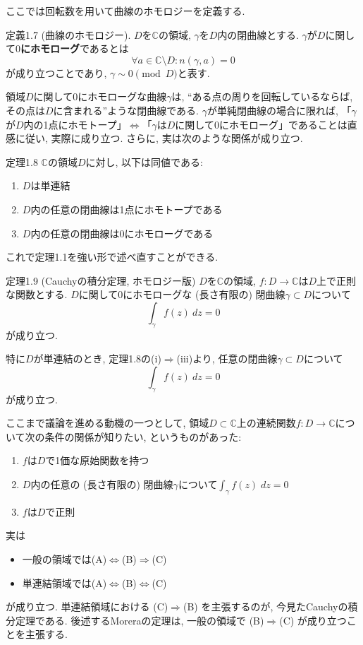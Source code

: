 \documentclass{jsarticle}
\newcommand{\C}{\mathbb{C}}%
\begin{document}
ここでは回転数を用いて曲線のホモロジーを定義する.

\begin{Def}{定義1.7 (曲線のホモロジー).}
$D$を$\C$の領域, $\gamma$を$D$内の閉曲線とする. $\gamma$が$D$に関して\textbf{$0$にホモローグ}であるとは
\[
\forall a \in \C\setminus D\colon n(\gamma, a) = 0
\]
が成り立つことであり, $\gamma\sim 0 \pmod D$と表す.
\end{Def}

領域$D$に関して$0$にホモローグな曲線$\gamma$は, ``ある点の周りを回転しているならば, その点は$D$に含まれる''ような閉曲線である. $\gamma$が単純閉曲線の場合に限れば, 「$\gamma$が$D$内の1点にホモトープ」$\Leftrightarrow$「$\gamma$は$D$に関して0にホモローグ」であることは直感に従い, 実際に成り立つ. さらに, 実は次のような関係が成り立つ.

\begin{thm}{定理1.8}
$\C$の領域$D$に対し, 以下は同値である$\colon$
\begin{enumerate}
\item[(i)]$D$は単連結
\item[(ii)]$D$内の任意の閉曲線は1点にホモトープである
\item[(iii)]$D$内の任意の閉曲線は0にホモローグである
\end{enumerate}
\end{thm}

\vspace{1em}
これで定理1.1を強い形で述べ直すことができる.

\begin{thm}{定理1.9 (Cauchyの積分定理, ホモロジー版)}
$D$を$\C$の領域, $f\colon D\to \C$は$D$上で正則な関数とする. $D$に関して0にホモローグな (長さ有限の) 閉曲線$\gamma\subset D$について
\[
\int_{\gamma}f(z)\:dz=0
\]
が成り立つ.
\end{thm}
特に$D$が単連結のとき, 定理1.8の(i)$\Rightarrow$(iii)より, 任意の閉曲線$\gamma\subset D$について
\[
\int_{\gamma}f(z)\:dz=0
\]
が成り立つ. 

\vspace{1em}
ここまで議論を進める動機の一つとして, 領域$D\subset\C$上の連続関数$f\colon D\to \C$について次の条件の関係が知りたい, というものがあった$\colon$
\begin{enumerate}
\item[(A)] $f$は$D$で1価な原始関数を持つ
\item[(B)]$D$内の任意の (長さ有限の) 閉曲線$\gamma$について$\int_{\gamma}f(z)\;dz = 0$
\item[(C)]$f$は$D$で正則
\end{enumerate}
実は
\begin{itemize}
\item 一般の領域では\hspace{1em}(A)$\Leftrightarrow$(B)$\Rightarrow$(C)
\item 単連結領域では\hspace{1em}(A)$\Leftrightarrow$(B)$\Leftrightarrow$(C)
\end{itemize}
が成り立つ. 単連結領域における (C)$\Rightarrow$(B) を主張するのが, 今見たCauchyの積分定理である. 後述するMoreraの定理は, 一般の領域で (B)$\Rightarrow$(C) が成り立つことを主張する.
\end{document}
